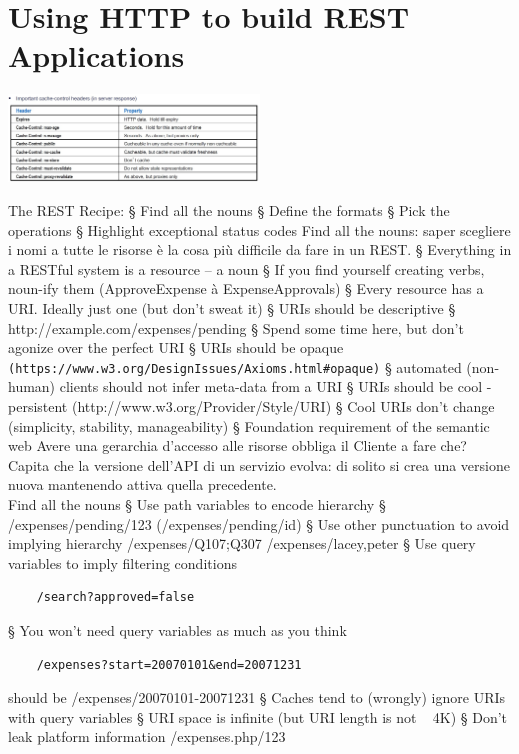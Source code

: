 \section{Using HTTP to build REST Applications}
\begin{center}
    \includegraphics[width=0.5\textwidth]{img/REST3.jpg}
\end{center}
The REST Recipe:
§ Find all the nouns
§ Define the formats
§ Pick the operations
§ Highlight exceptional status codes
Find all the nouns: saper scegliere i nomi a tutte le risorse è la cosa più difficile da fare in un REST.
§ Everything in a RESTful system is a resource – a noun
§ If you find yourself creating verbs, noun-ify them (ApproveExpense à ExpenseApprovals)
§ Every resource has a URI. Ideally just one (but don't sweat it)
§ URIs should be descriptive
§ http://example.com/expenses/pending
§ Spend some time here, but don't agonize over the perfect URI
§ URIs should be opaque \verb|(https://www.w3.org/DesignIssues/Axioms.html#opaque)|
§ automated (non-human) clients should not infer meta-data from a URI
§ URIs should be cool - persistent (http://www.w3.org/Provider/Style/URI)
§ Cool URIs don't change (simplicity, stability, manageability)
§ Foundation requirement of the semantic web
Avere una gerarchia d'accesso alle risorse obbliga il Cliente a fare che?
\\Capita che la versione dell'API di un servizio evolva: di solito si crea una versione nuova mantenendo attiva quella precedente.
\\Find all the nouns
§ Use path variables to encode hierarchy
§ /expenses/pending/123 (/expenses/pending/{id})
§ Use other punctuation to avoid implying hierarchy
/expenses/Q107;Q307
/expenses/lacey,peter
§ Use query variables to imply filtering conditions
\begin{verbatim}
    /search?approved=false
\end{verbatim}
§ You won't need query variables as much as you think
\begin{verbatim}
    /expenses?start=20070101&end=20071231
\end{verbatim}
should be
/expenses/20070101-20071231
§ Caches tend to (wrongly) ignore URIs with query variables
§ URI space is infinite (but URI length is not ~ 4K)
§ Don't leak platform information
/expenses.php/123

